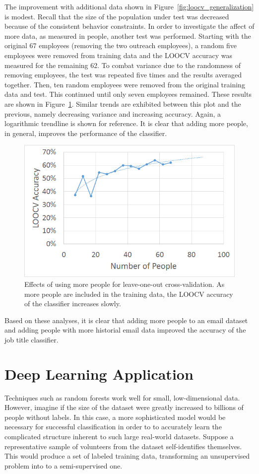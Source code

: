 \documentclass[12pt]{report}
\begin{document}
The improvement with additional data shown in Figure~\ref{fig:loocv_generalization} is modest.
Recall that the size of the population under test was decreased because of the consistent behavior constraints.
In order to investigate the affect of more data, as measured in people, another test was performed.
Starting with the original 67 employees (removing the two outreach employees), a random five employees were removed from training data and the LOOCV accuracy was measured for the remaining 62.
To combat variance due to the randomness of removing employees, the test was repeated five times and the results averaged together.
Then, ten random employees were removed from the original training data and test.
This continued until only seven employees remained.
These results are shown in Figure~\ref{fig:people_generalization}.
Similar trends are exhibited between this plot and the previous, namely decreasing variance and increasing accuracy.
Again, a logarithmic trendline is shown for reference.
It is clear that adding more people, in general, improves the performance of the classifier.
\begin{figure}[t]
    \centering
        \includegraphics[width=.7\columnwidth,trim={1mm 2mm 1mm 3.5mm},clip]{LOOCV_general}
        \vspace{-7pt}
        \caption[Effects of more people on prediction accuracy]{Effects of using more people for leave-one-out cross-validation.  As more people are included in the training data, the LOOCV accuracy of the classifier increases slowly.}
        \label{fig:people_generalization}
\end{figure}

Based on these analyses, it is clear that adding more people to an email dataset and adding people with more historial email data improved the accuracy of the job title classifier.

\section{Deep Learning Application}
Techniques such as random forests work well for small, low-dimensional data.
However, imagine if the size of the dataset were greatly increased to billions of people without labels.
In this case, a more sophisticated model would be necessary for successful classification in order to to accurately learn the complicated structure inherent to such large real-world datasets.
Suppose a representative sample of volunteers from the dataset self-identifies themselves.
This would produce a set of labeled training data, transforming an unsupervised problem into to a semi-supervised one. 
\end{document}
